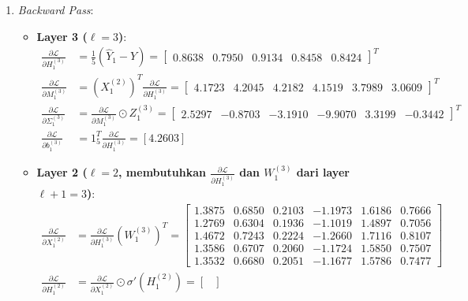 \documentclass[11pt,a4paper]{article}
\def\mathbf#1{#1}%
\theoremstyle{plain}
\theoremstyle{definition}
\theoremstyle{remark}
\begin{document}
\begin{enumerate}
    \item \textit{Backward Pass}:
    \begin{itemize}
        \item \textbf{Layer 3 ($\ell = 3$)}:
        \begin{align}
            \frac{\partial \mathcal{L}}{\partial H^{(3)}_1} &= \frac{1}{5}\left(\hat{Y}_1 - Y\right) = \begin{bmatrix} 0.8638 & 0.7950 & 0.9134 & 0.8458 & 0.8424 \end{bmatrix}^T \\[0.2em]
            \frac{\partial \mathcal{L}}{\partial M^{(3)}_1} &= \left(X^{(2)}_1\right)^T \frac{\partial \mathcal{L}}{\partial H^{(3)}_1} = \begin{bmatrix} 4.1723 & 4.2045 & 4.2182 & 4.1519 & 3.7989 & 3.0609 \end{bmatrix}^T \\[0.2em]
            \frac{\partial \mathcal{L}}{\partial \Sigma^{(3)}_1} &= \frac{\partial \mathcal{L}}{\partial M^{(3)}_1} \odot Z^{(3)}_1 = \begin{bmatrix} 2.5297 & -0.8703 & -3.1910 & -9.9070 & 3.3199 & -0.3442 \end{bmatrix}^T \\[0.2em]
            \frac{\partial \mathcal{L}}{\partial \mathbf{b}^{(3)}_1} &= \mathbf{1}_5^T \frac{\partial \mathcal{L}}{\partial H^{(3)}_1} = [4.2603]
        \end{align}
        \item \textbf{Layer 2 ($\ell = 2$, membutuhkan $\frac{\partial \mathcal{L}}{\partial H^{(3)}_1}$ dan $W^{(3)}_1$ dari layer $\ell+1 = 3$)}:
        \begin{align}
            \frac{\partial \mathcal{L}}{\partial X^{(2)}_1} &= \frac{\partial \mathcal{L}}{\partial H^{(3)}_1} \left(W^{(3)}_1\right)^T = \begin{bmatrix}
                1.3875 & 0.6850 & 0.2103 & -1.1973 & 1.6186 & 0.7666 \\
                1.2769 & 0.6304 & 0.1936 & -1.1019 & 1.4897 & 0.7056 \\
                1.4672 & 0.7243 & 0.2224 & -1.2660 & 1.7116 & 0.8107 \\
                1.3586 & 0.6707 & 0.2060 & -1.1724 & 1.5850 & 0.7507 \\
                1.3532 & 0.6680 & 0.2051 & -1.1677 & 1.5786 & 0.7477
            \end{bmatrix} \\[0.2em]
            \frac{\partial \mathcal{L}}{\partial H^{(2)}_1} &= \frac{\partial \mathcal{L}}{\partial X^{(2)}_1} \odot \sigma'\!\left(H^{(2)}_1\right) = \begin{bmatrix}

\end{bmatrix}
\end{align}
\end{itemize}
\end{enumerate}
\end{document}
